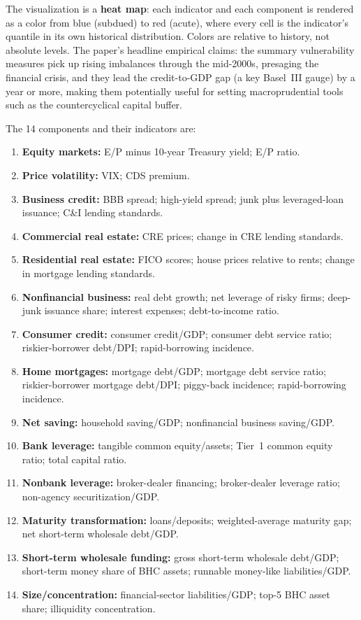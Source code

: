 \documentclass[11pt]{article}
\begin{document}
The visualization is a \textbf{heat map}: each indicator and each component
is rendered as a color from blue (subdued) to red (acute), where every
cell is the indicator's quantile in its own historical distribution.
Colors are relative to history, not absolute levels.  The paper's headline
empirical claims: the summary vulnerability measures pick up rising
imbalances through the mid-2000s, presaging the financial crisis, and they
lead the credit-to-GDP gap (a key Basel~III gauge) by a year or more,
making them potentially useful for setting macroprudential tools such as
the countercyclical capital buffer.

The 14 components and their indicators are:

\begin{enumerate}[nosep]
\item \textbf{Equity markets:} E/P minus 10-year Treasury yield; E/P ratio.
\item \textbf{Price volatility:} VIX; CDS premium.
\item \textbf{Business credit:} BBB spread; high-yield spread; junk plus
leveraged-loan issuance; C\&I lending standards.
\item \textbf{Commercial real estate:} CRE prices; change in CRE lending
standards.
\item \textbf{Residential real estate:} FICO scores; house prices relative
to rents; change in mortgage lending standards.
\item \textbf{Nonfinancial business:} real debt growth; net leverage of
risky firms; deep-junk issuance share; interest expenses; debt-to-income
ratio.
\item \textbf{Consumer credit:} consumer credit/GDP; consumer debt service
ratio; riskier-borrower debt/DPI; rapid-borrowing incidence.
\item \textbf{Home mortgages:} mortgage debt/GDP; mortgage debt service
ratio; riskier-borrower mortgage debt/DPI; piggy-back incidence;
rapid-borrowing incidence.
\item \textbf{Net saving:} household saving/GDP; nonfinancial business
saving/GDP.
\item \textbf{Bank leverage:} tangible common equity/assets; Tier~1 common
equity ratio; total capital ratio.
\item \textbf{Nonbank leverage:} broker-dealer financing; broker-dealer
leverage ratio; non-agency securitization/GDP.
\item \textbf{Maturity transformation:} loans/deposits; weighted-average
maturity gap; net short-term wholesale debt/GDP.
\item \textbf{Short-term wholesale funding:} gross short-term wholesale
debt/GDP; short-term money share of BHC assets; runnable money-like
liabilities/GDP.
\item \textbf{Size/concentration:} financial-sector liabilities/GDP; top-5
BHC asset share; illiquidity concentration.
\end{enumerate}
\end{document}
